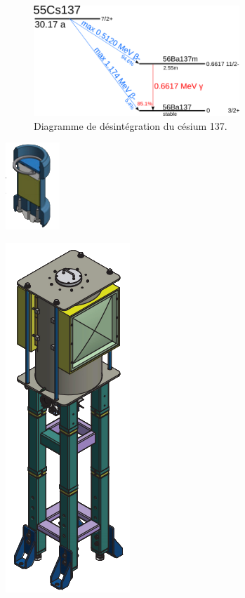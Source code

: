 \begin{figure}[!ht]
	\centering
	\includegraphics[width=0.69\textwidth]{GLA/Cesium137.png}
	\caption{Diagramme de désintégration du césium 137.}
	\label{Diagramme}
\end{figure}


\marginpar
{
	\centering
	\includegraphics[width=0.5\marginparwidth]{GLA/Source.png}
	\label{Source}
}

\marginpar
{
	\centering
	\includegraphics[width=0.5\marginparwidth]{GLA/Irradiateur.png}
	\label{Irradiateur}
}

